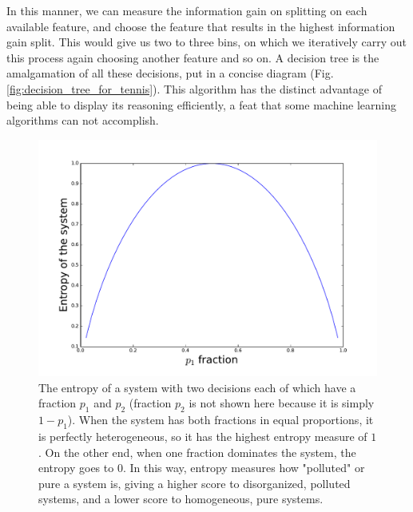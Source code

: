 In this manner, we can measure the information gain on splitting on each available feature, and choose the feature that results in the highest information gain split. This would give us two to three bins, on which we iteratively carry out this process again choosing another feature and so on. A decision tree is the amalgamation of all these decisions, put in a concise diagram (Fig. \ref{fig:decision_tree_for_tennis}). This algorithm has the distinct advantage of being able to display its reasoning efficiently, a feat that some machine learning algorithms can not accomplish.

\begin{figure}
  \centering
  \includegraphics[width=\linewidth]{figures/entropy_fig.pdf}
  \caption{The entropy of a system with two decisions each of which have a fraction $p_1$ and $p_2$ (fraction $p_2$ is not shown here because it is simply $1-p_1$). When the system has both fractions in equal proportions, it is perfectly heterogeneous, so it has the highest entropy measure of $1$. On the other end, when one fraction dominates the system, the entropy goes to $0$. In this way, entropy measures how "polluted" or pure a system is, giving a higher score to disorganized, polluted systems, and a lower score to homogeneous, pure systems.}
  \label{fig:entropy_two_decisions}
\end{figure}

